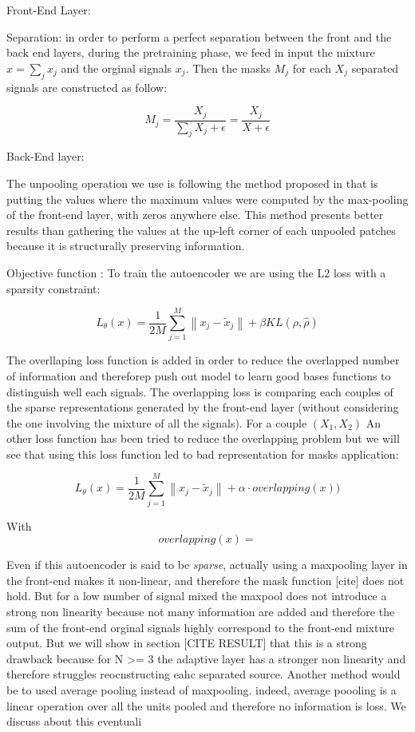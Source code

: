 \documentclass[master,final,11pt]{iscs-thesis}
\newcommand{\norm}[1]{\left\lVert#1\right\rVert}
\begin{document}
Front-End Layer: 

Separation: in order to perform a perfect separation between the front and the back end layers, during the pretraining phase, we feed in input the mixture $x = \sum_j x_j $ and the orginal signals $x_j$. Then the masks $M_j$ for each $X_j$ separated signals are constructed as follow:

\[M_j = \frac{X_j}{\sum_j{X_j} + \epsilon} =  \frac{X_j}{X + \epsilon}\]


Back-End layer:

The unpooling operation we use is following the method proposed in \cite{unpool} that is putting the values where the maximum values were computed by the max-pooling of the front-end layer, with zeros anywhere else. This method presents better results than gathering the values at the up-left corner of each unpooled patches because it is structurally preserving information.

Objective function : To train the autoencoder we are using the L2 loss with a sparsity constraint:

\[L_\theta(x) = \frac{1}{2M} \sum_{j=1}^{M}{\norm{x_j - \tilde{x}_j}} + \beta KL(\rho, \hat{\rho})\]

The overllaping loss function is added in order to reduce the overlapped number of information and thereforep push out model to learn good bases functions to distinguish well each signals. The overlapping loss is comparing each couples of the sparse representations generated by the front-end layer (without considering the one involving the mixture of all the signals). For a couple $(X_1,X_2)$
An other loss function has been tried to reduce the overlapping problem but we will see that using this loss function led to bad representation for masks application:

\[L_\theta(x) = \frac{1}{2M} \sum_{j=1}^{M}{\norm{x_j - \tilde{x}_j}} + \alpha \cdot overlapping(x) )\]

With 
\[overlapping(x) = \]


Even if this autoencoder is said to be \textit{sparse}, actually using a maxpooling layer in the front-end makes it non-linear, and therefore the mask function [cite] does not hold. But for a low number of signal mixed the maxpool does not introduce a strong non linearity because not many information are added and therefore the sum of the front-end orginal signals highly correspond to the front-end mixture output. But we will show in section [CITE RESULT] that this is a strong drawback because for N >= 3 the adaptive layer has a stronger non linearity and therefore struggles reocnstructing eahc separated source.
Another method would be to used average pooling instead of maxpooling. indeed, average poooling is a linear operation over all the units pooled and therefore no information is loss. We discuss about this eventuali
\end{document}

